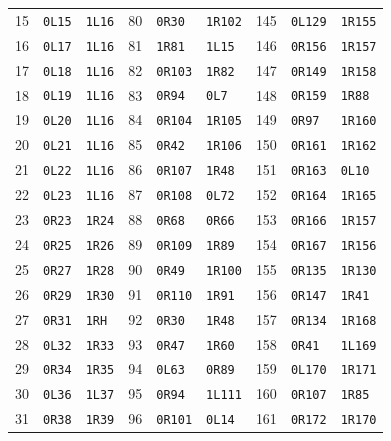 {\begin{longtable}{@{}rll@{\hspace{1.8em}}rll@{\hspace{1.8em}}rll@{}}
15 & \texttt{0L15} & \texttt{1L16} & 80 & \texttt{0R30} & \texttt{1R102} & 145 & \texttt{0L129} & \texttt{1R155}\\
16 & \texttt{0L17} & \texttt{1L16} & 81 & \texttt{1R81} & \texttt{1L15} & 146 & \texttt{0R156} & \texttt{1R157}\\
17 & \texttt{0L18} & \texttt{1L16} & 82 & \texttt{0R103} & \texttt{1R82} & 147 & \texttt{0R149} & \texttt{1R158}\\
18 & \texttt{0L19} & \texttt{1L16} & 83 & \texttt{0R94} & \texttt{0L7} & 148 & \texttt{0R159} & \texttt{1R88}\\
19 & \texttt{0L20} & \texttt{1L16} & 84 & \texttt{0R104} & \texttt{1R105} & 149 & \texttt{0R97} & \texttt{1R160}\\
20 & \texttt{0L21} & \texttt{1L16} & 85 & \texttt{0R42} & \texttt{1R106} & 150 & \texttt{0R161} & \texttt{1R162}\\
21 & \texttt{0L22} & \texttt{1L16} & 86 & \texttt{0R107} & \texttt{1R48} & 151 & \texttt{0R163} & \texttt{0L10}\\
22 & \texttt{0L23} & \texttt{1L16} & 87 & \texttt{0R108} & \texttt{0L72} & 152 & \texttt{0R164} & \texttt{1R165}\\
23 & \texttt{0R23} & \texttt{1R24} & 88 & \texttt{0R68} & \texttt{0R66} & 153 & \texttt{0R166} & \texttt{1R157}\\
24 & \texttt{0R25} & \texttt{1R26} & 89 & \texttt{0R109} & \texttt{1R89} & 154 & \texttt{0R167} & \texttt{1R156}\\
25 & \texttt{0R27} & \texttt{1R28} & 90 & \texttt{0R49} & \texttt{1R100} & 155 & \texttt{0R135} & \texttt{1R130}\\
26 & \texttt{0R29} & \texttt{1R30} & 91 & \texttt{0R110} & \texttt{1R91} & 156 & \texttt{0R147} & \texttt{1R41}\\
27 & \texttt{0R31} & \texttt{1RH} & 92 & \texttt{0R30} & \texttt{1R48} & 157 & \texttt{0R134} & \texttt{1R168}\\
28 & \texttt{0L32} & \texttt{1R33} & 93 & \texttt{0R47} & \texttt{1R60} & 158 & \texttt{0R41} & \texttt{1L169}\\
29 & \texttt{0R34} & \texttt{1R35} & 94 & \texttt{0L63} & \texttt{0R89} & 159 & \texttt{0L170} & \texttt{1R171}\\
30 & \texttt{0L36} & \texttt{1L37} & 95 & \texttt{0R94} & \texttt{1L111} & 160 & \texttt{0R107} & \texttt{1R85}\\
31 & \texttt{0R38} & \texttt{1R39} & 96 & \texttt{0R101} & \texttt{0L14} & 161 & \texttt{0R172} & \texttt{1R170}\\

\end{longtable}}
